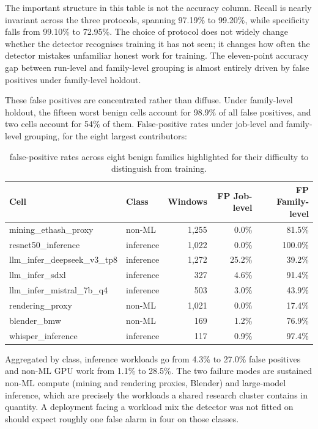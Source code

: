 The important structure in this table is not the accuracy column. Recall is nearly invariant across the three protocols, spanning 97.19\% to 99.20\%, while specificity falls from 99.10\% to 72.95\%. The choice of protocol does not widely change whether the detector recognises training it has not seen; it changes how often the detector mistakes unfamiliar honest work for training. The eleven-point accuracy gap between run-level and family-level grouping is almost entirely driven by false positives under family-level holdout.

These false positives are concentrated rather than diffuse. Under family-level holdout, the fifteen worst benign cells account for 98.9\% of all false positives, and two cells account for 54\% of them. False-positive rates under job-level and family-level grouping, for the eight largest contributors:

\begin{table}[htbp]
\centering
\footnotesize
\begin{tabular}{llrrr}
\toprule
\textbf{Cell} & \textbf{Class} & \textbf{Windows} & \textbf{FP Job-level} & \textbf{FP Family-level} \\
\midrule
mining\_ethash\_proxy & non-ML & 1,255 & 0.0\% & 81.5\% \\
resnet50\_inference & inference & 1,022 & 0.0\% & 100.0\% \\
llm\_infer\_deepseek\_v3\_tp8 & inference & 1,272 & 25.2\% & 39.2\% \\
llm\_infer\_sdxl & inference & 327 & 4.6\% & 91.4\% \\
llm\_infer\_mistral\_7b\_q4 & inference & 503 & 3.0\% & 43.9\% \\
rendering\_proxy & non-ML & 1,021 & 0.0\% & 17.4\% \\
blender\_bmw & non-ML & 169 & 1.2\% & 76.9\% \\
whisper\_inference & inference & 117 & 0.9\% & 97.4\% \\
\bottomrule
\end{tabular}
\caption{false-positive rates across eight benign families highlighted for their difficulty to distinguish from training.}
\label{tab:fp}
\end{table}

Aggregated by class, inference workloads go from 4.3\% to 27.0\% false positives and non-ML GPU work from 1.1\% to 28.5\%. The two failure modes are sustained non-ML compute (mining and rendering proxies, Blender) and large-model inference, which are precisely the workloads a shared research cluster contains in quantity. A deployment facing a workload mix the detector was not fitted on should expect roughly one false alarm in four on those classes.

